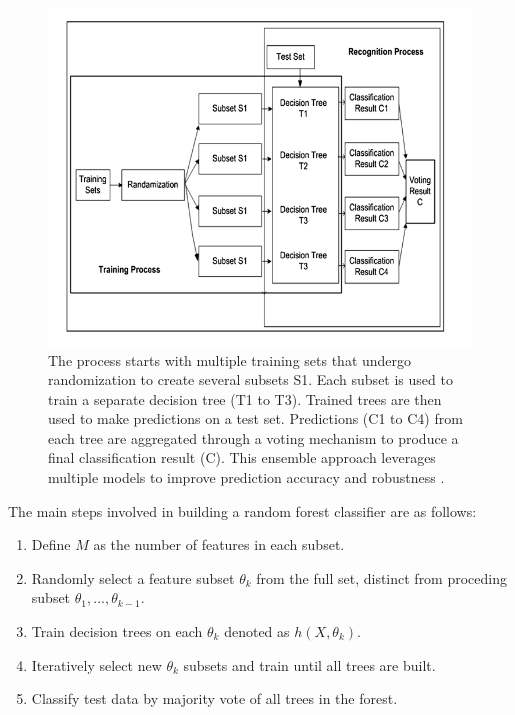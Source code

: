            \begin{figure}[H]
            \centering
            \includegraphics[width=.7\textwidth]{../src/resources/images/models/rf_image.png}
            \caption{
                The process starts with multiple training sets that undergo randomization to create several subsets S1. Each subset is used to train a separate decision tree (T1 to T3). Trained trees are then used to make predictions on a test set. Predictions (C1 to C4) from each tree are aggregated through a voting mechanism to produce a final classification result (C). This ensemble approach leverages multiple models to improve prediction accuracy and robustness \cite{parmar_review_2019}.
            }
            \label{fig:random_forest}
            \end{figure}

            The main steps involved in building a random forest classifier are as follows:
           
            \begin{enumerate}
                \item Define $M$ as the number of features in each subset.
                \item Randomly select a feature subset $\theta_k$ from the full set, distinct from proceding subset $\theta_{1},..., \theta_{k-1}$.
                \item Train decision trees on each $\theta_k$ denoted as $h(X, \theta_k)$.
                \item Iteratively select new $\theta_k$ subsets and train until all trees are built.
                \item Classify test data by majority vote of all trees in the forest.
            \end{enumerate}

